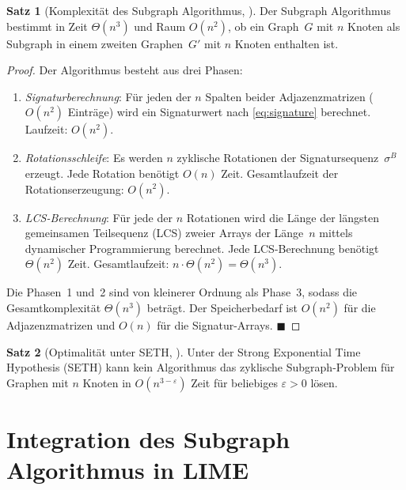 ﻿\documentclass[a4paper,12pt]{article}
\theoremstyle{definition}
\newtheorem{satz}{Satz}[section]
\begin{document}
\begin{satz}[Komplexität des Subgraph Algorithmus, \citealt{Epp2026}]
  \label{satz:complexity}
  Der Subgraph Algorithmus bestimmt in Zeit $\Theta(n^3)$ und Raum $O(n^2)$, ob
  ein Graph~$G$ mit $n$ Knoten als Subgraph in einem zweiten Graphen~$G'$ mit $n$
  Knoten enthalten ist.
\end{satz}

\begin{proof}
  Der Algorithmus besteht aus drei Phasen:
  \begin{enumerate}
    \item \emph{Signaturberechnung}: Für jeden der $n$ Spalten beider Adjazenzmatrizen
          ($O(n^2)$ Einträge) wird ein Signaturwert nach \eqref{eq:signature} berechnet.
          Laufzeit: $O(n^2)$.
    \item \emph{Rotationsschleife}: Es werden $n$ zyklische Rotationen der
          Signatursequenz~$\sigma^B$ erzeugt.
          Jede Rotation benötigt $O(n)$ Zeit.
          Gesamtlaufzeit der Rotationserzeugung: $O(n^2)$.
    \item \emph{LCS-Berechnung}: Für jede der $n$ Rotationen wird die Länge der
          längsten gemeinsamen Teilsequenz (LCS) zweier Arrays der Länge~$n$ mittels
          dynamischer Programmierung berechnet.
          Jede LCS-Berechnung benötigt $\Theta(n^2)$ Zeit.
          Gesamtlaufzeit: $n \cdot \Theta(n^2) = \Theta(n^3)$.
  \end{enumerate}

  Die Phasen~1 und~2 sind von kleinerer Ordnung als Phase~3, sodass die
  Gesamtkomplexität $\Theta(n^3)$ beträgt.
  Der Speicherbedarf ist $O(n^2)$ für die Adjazenzmatrizen und $O(n)$ für
  die Signatur-Arrays. \hfill$\blacksquare$
\end{proof}

\begin{satz}[Optimalität unter SETH, \citealt{Epp2026}]
  Unter der Strong Exponential Time Hypothesis (SETH) kann kein Algorithmus das
  zyklische Subgraph-Problem für Graphen mit $n$ Knoten in
  $O(n^{3-\varepsilon})$ Zeit für beliebiges $\varepsilon > 0$ lösen.
\end{satz}

\section{Integration des Subgraph Algorithmus in LIME}
\end{document}
